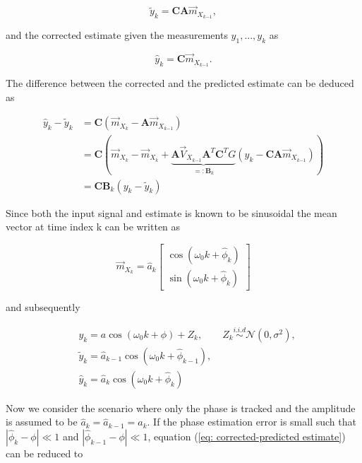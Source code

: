 \documentclass[11pt,a4paper,twoside]{report}
\newcommand{\messF}[3]{\overrightarrow{#1}_{{#2}_{k{#3}}}}
\newcommand{\mat}[1]{\mathbf{#1}}
\begin{document}
\begin{equation*}
	\tilde{y}_k = \mat{CA}\messF{m}{X}{-1},
\end{equation*}

and the corrected estimate given the measurements ${y_1,...,y_k}$ as

\begin{equation*}
	\hat{y}_k = \mat{C}\messF{m}{X}{-1}.
\end{equation*}

The difference between the corrected and the predicted estimate can be deduced as

\begin{align}
	\hat{y}_k - \tilde{y}_k &= \mat{C}\left(\messF{m}{X}{} - \mat{A}\messF{m}{X}{-1}\right) \\
	\nonumber
	&= \mat{C}\left(\messF{m}{X}{} - \messF{m}{X}{} + \underbrace{\mat{A}\messF{V}{X}{-1}\mat{A}^T\mat{C}^TG}_{=:\mat{B}_k}\left(y_k-\mat{CA}\messF{m}{X}{-1}\right)\right) \\
	\label{eq: corrected-predicted estimate}
	&= \mat{C}\mat{B}_k\left(y_k - \tilde{y}_k\right)
\end{align}

Since both the input signal and estimate is known to be sinusoidal the mean vector at time index k can be written as \cite{ST:Malmberg}

\begin{equation*}
	\messF{m}{X}{} = \hat{a}_k
		\begin{bmatrix}
			\cos{\left(\omega_0k + \hat{\phi}_k\right)} \\
			\sin{\left(\omega_0k + \hat{\phi}_k\right)}
		\end{bmatrix}
\end{equation*}

and subsequently

\begin{align}
	& y_k = a\cos{\left(\omega_0k + \phi\right)} + Z_k, \qquad Z_k \overset{i.i.d}{\sim} \mathcal{N}\left(0, \sigma^2\right), \\
	& \tilde{y}_k = \hat{a}_{k-1}\cos{\left(\omega_0k + \hat{\phi}_{k-1}\right)}, \\
	& \hat{y}_k = \hat{a}_k\cos{\left(\omega_0k + \hat{\phi}_k\right)}
\end{align}


Now we consider the scenario where only the phase is tracked and the amplitude is assumed to be $\hat{a}_k = \hat{a}_{k-1} = a_k$. If the phase estimation error is small such that $\left|\hat{\phi}_k - \phi\right|\ll1$ and $\left|\hat{\phi}_{k-1} - \phi\right|\ll1$, equation (\ref{eq: corrected-predicted estimate}) can be reduced to
\end{document}
